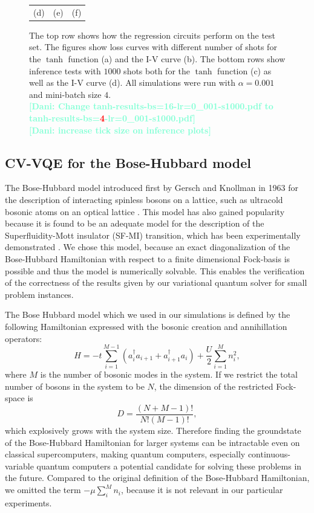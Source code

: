 \documentclass[12pt, a4paper,  nobibnotes]{article}
\newcommand{\red}[1]{\textcolor{red}{#1}}
\newcommand{\nd}[1]{\textcolor{Aquamarine}{\textbf{[Dani: #1]}}}
\begin{document}
\begin{figure}[H]
\begin{tabular}{ccc}
      (d) & (e) & (f) \\[6.5pt]
    \end{tabular}
    \caption{The top row shows how the regression circuits perform on the test set. The figures show
    loss curves with different number of shots for the $\tanh$ function (a) and the I-V curve (b).
    The bottom rows show inference tests with $1000$ shots both for the $\tanh$ function (c) as well
    as the I-V curve (d).
    All simulations were run with $\alpha=0.001$ and mini-batch size $4$.\\
    \nd{Change tanh-results-bs=16-lr=0\_001-s1000.pdf to tanh-results-bs=\red{4}-lr=0\_001-s1000.pdf}\\
    \nd{increase tick size on inference plots}
    }
    \label{fig:regression_results}
\end{figure}

\subsection{CV-VQE for the Bose-Hubbard model}
\label{sec:bh-vqe-results}
The Bose-Hubbard model introduced first by Gersch and Knollman in 1963 for the description of interacting spinless bosons on a lattice, such as ultracold bosonic atoms on an optical lattice
\cite{BoseHubbardOriginal,ColdAtomtHubbard}. This model has also gained popularity because it is found to be an adequate model for the description of the Superfluidity-Mott insulator (SF-MI) transition, which has been experimentally demonstrated \cite{SuperfluidityMottTransition,Greiner2002}.
We chose this model, because an exact diagonalization of the Bose-Hubbard Hamiltonian with respect to a finite dimensional Fock-basis is possible and thus the model is numerically solvable. This enables the verification of the correctness of the results given by our variational quantum solver for small problem instances.
\par
The Bose Hubbard model which we used in our simulations is defined by the following Hamiltonian expressed with the bosonic creation and annihillation operators:
\begin{equation}
     H = -t\sum\limits_{i=1}^{M-1}( a_{i}^\dagger  a_{i+1} +  a_{i+1}^\dagger  a_{i}) + \frac{U}{2}\sum\limits_{i=1}^{M} n_i^2 ,
     \label{eq:bhhamiltonian}
\end{equation}
where $M$ is the number of bosonic modes in the system. If we restrict the total number of bosons in the system to be $N$, the dimension of the restricted Fock-space is
\begin{equation}
    D = \frac{(N+M-1)!}{N!(M-1)!},
\end{equation}
which explosively grows with the system size. Therefore finding the groundstate of the Bose-Hubbard Hamiltonian for larger systems can be intractable even on classical supercomputers, making quantum computers, especially continuous-variable quantum computers a potential candidate for solving these problems in the future.
Compared to the original definition of the Bose-Hubbard Hamiltonian, we omitted the term $-\mu\sum\limits_{i}^{M} n_i$, because it is not relevant in our particular experiments.
\end{document}
